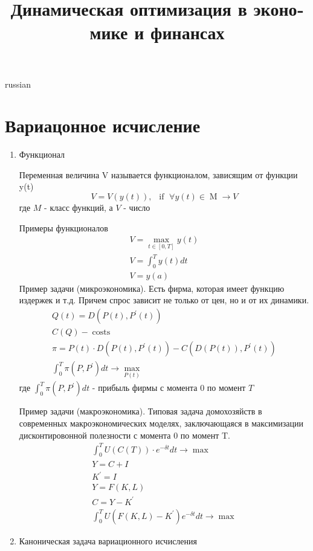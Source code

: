 \documentclass{article}
\begin{document}
\title{\foreignlanguage{russian}{Динамическая оптимизация в экономике и финансах}}
\maketitle

\begin{otherlanguage*}{russian}
\section{\foreignlanguage{russian}{Вариацонное исчисление}}

\begin{enumerate}

\item Функционал

Переменная величина V называется функционалом, зависящим от функции y(t) 	
\begin{equation}
V = V(y(t)), \,\,\, \operatorname{if} \,\, \forall y(t) \in \operatorname{M} \rightarrow V 
\end{equation}
где $M$ - класс функций, а $V$ - число 

Примеры функционалов
\begin{align}
V = \max_{t \in [0, T]} y(t) \\
V = \int_{0}^T y(t) dt \\
V = y(a) 
\end{align}
Пример задачи (микроэкономика). Есть фирма, которая имеет функцию издержек и т.д. Причем спрос зависит не только от цен, но и от их динамики. 
\begin{align}
Q(t) = D(P(t), P^{'}(t)) \\
C(Q) - \operatorname{costs} \\
\pi = P(t) \cdot D(P(t), P^{'} (t)) - C(D(P(t)), P^{'}(t)) \\
\int_{0}^T \pi (P, P^{'}) dt \rightarrow \max_{P(t)} 
\end{align}
где $\int_0^T \pi(P, P^{'}) dt$ - прибыль фирмы с момента 0 по момент $T$ 


Пример задачи (макроэкономика). Типовая задача домохозяйств в современных макроэкономических моделях, заключающаяся в максимизации дисконтировонной полезности с момента 0 по момент T. 
\begin{align}
\int_0^T U(C(T)) \cdot e^{-\delta t} dt \rightarrow \max \\
Y = C +  I \\
K^{'} = I \\
Y = F(K, L) \\
C = Y - K^{'} \\
\int_{0}^T U(F(K, L) - K^{'}) e^{-\delta t} dt \rightarrow \max 
\end{align}
\item Каноническая задача вариационного исчисления 


\end{enumerate}
\end{otherlanguage*}
\end{document}

